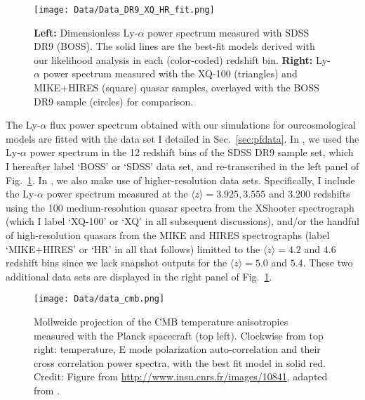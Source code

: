 \begin{figure}
\begin{center}
\texttt{[image: Data/Data\_DR9\_XQ\_HR\_fit.png]}
\caption{\textbf{Left:} Dimensionless Ly-$\alpha$ power spectrum measured with SDSS DR9 (BOSS). The solid lines are the best-fit models derived with our likelihood analysis in each (color-coded) redshift bin. \textbf{Right:} Ly-$\alpha$ power spectrum measured with the XQ-100 (triangles) and MIKE+HIRES (square) quasar samples, overlayed with the BOSS DR9 sample (circles) for comparison.}
\label{fig:data_lya}
\end{center}
\end{figure}

The Ly-$\alpha$ flux power spectrum obtained with our simulations for ourcosmological models are fitted with the data set I detailed in Sec.~\ref{sec:pfdata}. In \cite{Palanque2015a, Palanque2015b, Baur16}, we used the Ly-$\alpha$ power spectrum in the 12 redshift bins of the SDSS DR9 sample set, which I hereafter label `BOSS' or `SDSS' data set, and re-transcribed in the left panel of Fig.~\ref{fig:data_lya}. In \cite{Yeche17, Baur17, Armengaud_FDM}, we also make use of higher-resolution data sets. Specifically, I include the Ly-$\alpha$ power spectrum measured at the $\langle z \rangle = 3.925, 3.555$ and $3.200$ redshifts using the 100 medium-resolution quasar spectra from the XShooter spectrograph (which I label `XQ-100' or `XQ' in all subsequent discussions), and/or the handful of high-resolution quasars from the MIKE and HIRES spectrographs (label `MIKE+HIRES' or `HR' in all that follows) limitted to the $\langle z \rangle = 4.2$ and $4.6$ redshift bins since we lack snapshot outputs for the $\langle z \rangle = 5.0$ and $5.4$. These two additional data sets are displayed in the right panel of Fig.~\ref{fig:data_lya}. \\

\begin{figure}
\begin{center}
\texttt{[image: Data/data\_cmb.png]}
\caption{Mollweide projection of the CMB temperature anisotropies measured with the Planck spacecraft (top left). Clockwise from top right: temperature, E mode polarization auto-correlation and their cross correlation power spectra, with the best fit model in solid red. Credit: Figure from \url{http://www.insu.cnrs.fr/images/10841}, adapted from \cite{Planck2015}.}
\label{fig:data_cmb}
\end{center}
\end{figure}

